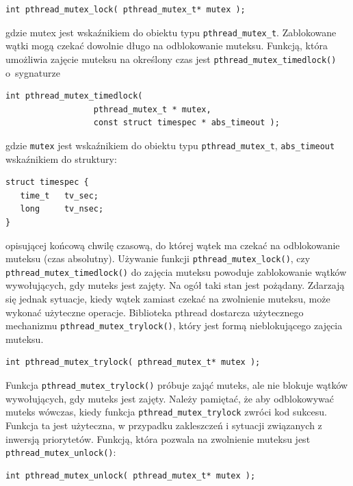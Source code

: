 \begin{lstlisting}[style=MyCStyle]
int pthread_mutex_lock( pthread_mutex_t* mutex );
\end{lstlisting}
gdzie mutex jest wskaźnikiem do obiektu typu \lstinline[style=MyCStyle]{pthread_mutex_t}. Zablokowane wątki mogą czekać dowolnie długo na odblokowanie muteksu. Funkcją, która umożliwia zajęcie muteksu na określony czas jest \lstinline[style=MyCStyle]{pthread_mutex_timedlock()} o~sygnaturze
\begin{lstlisting}[style=MyCStyle]
int pthread_mutex_timedlock(
                  pthread_mutex_t * mutex,
                  const struct timespec * abs_timeout );
\end{lstlisting}
gdzie \lstinline[style=MyCStyle]{mutex} jest wskaźnikiem do obiektu typu \lstinline[style=MyCStyle]{pthread_mutex_t}, \lstinline[style=MyCStyle]{abs_timeout} wskaźnikiem do struktury:
\begin{lstlisting}[style=MyCStyle]
struct timespec {
   time_t   tv_sec;
   long     tv_nsec;
}
\end{lstlisting}
opisującej końcową chwilę czasową, do której wątek ma czekać na odblokowanie muteksu (czas absolutny).
Używanie funkcji \lstinline[style=MyCStyle]{pthread_mutex_lock()}, czy \lstinline[style=MyCStyle]{pthread_mutex_timedlock()} do zajęcia muteksu powoduje zablokowanie wątków wywołujących, gdy muteks jest zajęty. Na ogół taki stan jest pożądany. Zdarzają się jednak sytuacje, kiedy wątek zamiast czekać na zwolnienie muteksu, może wykonać użyteczne operacje. Biblioteka pthread dostarcza użytecznego mechanizmu \lstinline[style=MyCStyle]{pthread_mutex_trylock()}, który jest formą nieblokującego zajęcia muteksu.

\begin{lstlisting}[style=MyCStyle]
int pthread_mutex_trylock( pthread_mutex_t* mutex );
\end{lstlisting}

Funkcja \lstinline[style=MyCStyle]{pthread_mutex_trylock()} próbuje zająć muteks, ale nie blokuje wątków wywołujących, gdy muteks jest zajęty. Należy pamiętać, że aby odblokowywać muteks wówczas, kiedy funkcja \lstinline[style=MyCStyle]{pthread_mutex_trylock} zwróci kod sukcesu. Funkcja ta jest użyteczna, w przypadku zakleszczeń i sytuacji związanych z inwersją priorytetów. Funkcją, która pozwala na zwolnienie muteksu jest \lstinline[style=MyCStyle]{pthread_mutex_unlock()}:

\begin{lstlisting}[style=MyCStyle]
int pthread_mutex_unlock( pthread_mutex_t* mutex );
\end{lstlisting}

